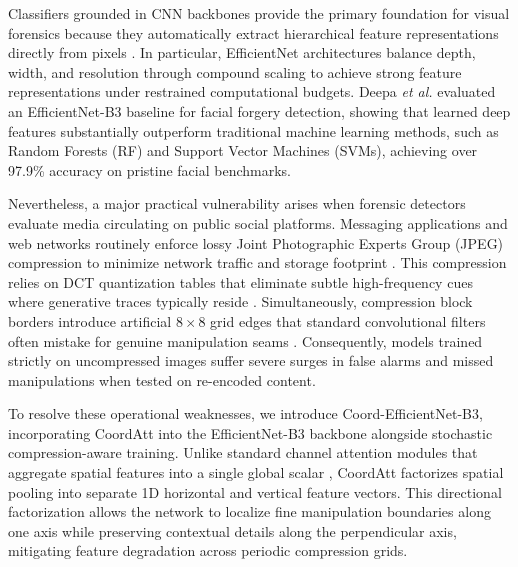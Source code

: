 \documentclass[conference]{IEEEtran}
\begin{document}
Classifiers grounded in CNN backbones provide the primary foundation for visual forensics because they automatically extract hierarchical feature representations directly from pixels \cite{tan2019efficientnet}. In particular, EfficientNet architectures balance depth, width, and resolution through compound scaling to achieve strong feature representations under restrained computational budgets. Deepa \emph{et al.} \cite{deepa2026enhanced} evaluated an EfficientNet-B3 baseline for facial forgery detection, showing that learned deep features substantially outperform traditional machine learning methods, such as Random Forests (RF) and Support Vector Machines (SVMs), achieving over 97.9\% accuracy on pristine facial benchmarks.

Nevertheless, a major practical vulnerability arises when forensic detectors evaluate media circulating on public social platforms. Messaging applications and web networks routinely enforce lossy Joint Photographic Experts Group (JPEG) compression to minimize network traffic and storage footprint \cite{verdoliva2020media}. This compression relies on DCT quantization tables that eliminate subtle high-frequency cues where generative traces typically reside \cite{rossler2019faceforensics}. Simultaneously, compression block borders introduce artificial $8 \times 8$ grid edges that standard convolutional filters often mistake for genuine manipulation seams \cite{bondi2020training}. Consequently, models trained strictly on uncompressed images suffer severe surges in false alarms and missed manipulations when tested on re-encoded content.

To resolve these operational weaknesses, we introduce Coord-EfficientNet-B3, incorporating CoordAtt \cite{hou2021coordinate} into the EfficientNet-B3 backbone alongside stochastic compression-aware training. Unlike standard channel attention modules that aggregate spatial features into a single global scalar \cite{hu2018squeeze}, CoordAtt factorizes spatial pooling into separate 1D horizontal and vertical feature vectors. This directional factorization allows the network to localize fine manipulation boundaries along one axis while preserving contextual details along the perpendicular axis, mitigating feature degradation across periodic compression grids.
\end{document}
